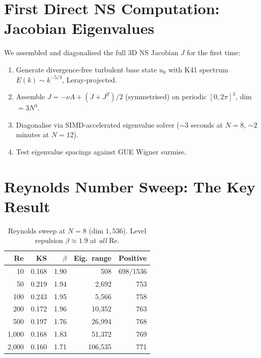 \documentclass[11pt,a4paper]{article}
\theoremstyle{plain}
\theoremstyle{definition}
\theoremstyle{remark}
\begin{document}
\section{First Direct NS Computation: Jacobian Eigenvalues}

We assembled and diagonalised the full 3D NS Jacobian $J$ for the first time:

\begin{enumerate}[nosep]
\item Generate divergence-free turbulent base state $u_0$ with K41 spectrum $E(k) \sim k^{-5/3}$, Leray-projected.
\item Assemble $J = -\nu A + (J + J^T)/2$ (symmetrised) on periodic $[0,2\pi]^3$, dim $= 3N^3$.
\item Diagonalise via SIMD-accelerated eigenvalue solver ($\sim 3$ seconds at $N = 8$, $\sim 2$ minutes at $N = 12$).
\item Test eigenvalue spacings against GUE Wigner surmise.
\end{enumerate}

\section{Reynolds Number Sweep: The Key Result}

\begin{table}[H]
\centering
\caption{Reynolds sweep at $N = 8$ (dim $1{,}536$). Level repulsion $\beta \approx 1.9$ at \emph{all} Re.}
\begin{tabular}{rrrrr}
\toprule
Re & KS & $\beta$ & Eig.\ range & Positive \\
\midrule
10 & 0.168 & 1.90 & 508 & 698/1536 \\
50 & 0.219 & 1.94 & 2{,}692 & 753 \\
100 & 0.243 & 1.95 & 5{,}566 & 758 \\
200 & 0.172 & 1.96 & 10{,}352 & 763 \\
500 & 0.197 & 1.76 & 26{,}994 & 768 \\
1{,}000 & 0.168 & 1.83 & 51{,}372 & 769 \\
2{,}000 & 0.160 & 1.71 & 106{,}535 & 771 \\
\bottomrule
\end{tabular}
\end{table}
\end{document}
